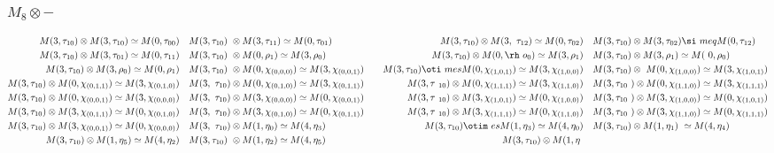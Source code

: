 \subsubsection{$M_8\otimes -$}
\begin{align*}
M(3,\tau_{10}) \otimes M(3,\tau_{10}) \simeq M(0,\tau_{00}) &&& M(3,\tau_{10})\
 \otimes M(3,\tau_{11}) \simeq M(0,\tau_{01}) &&& M(3,\tau_{10}) \otimes M(3,\
\tau_{12}) \simeq M(0,\tau_{02}) &&& M(3,\tau_{10}) \otimes M(3,\tau_{02}) \si\
meq M(0,\tau_{12})\\
M(3,\tau_{10}) \otimes M(3,\tau_{01}) \simeq M(0,\tau_{11}) &&& M(3,\tau_{10})\
 \otimes M(0,\rho_{1}) \simeq M(3,\rho_{0}) &&& M(3,\tau_{10}) \otimes M(0,\rh\
o_{0}) \simeq M(3,\rho_{1}) &&& M(3,\tau_{10}) \otimes M(3,\rho_{1}) \simeq M(\
0,\rho_{0})\\
M(3,\tau_{10}) \otimes M(3,\rho_{0}) \simeq M(0,\rho_{1}) &&& M(3,\tau_{10}) \
\otimes M(0,\chi_{(0,0,0)}) \simeq M(3,\chi_{(0,0,1)}) &&& M(3,\tau_{10}) \oti\
mes M(0,\chi_{(1,0,1)}) \simeq M(3,\chi_{(1,0,0)}) &&& M(3,\tau_{10}) \otimes \
M(0,\chi_{(1,0,0)}) \simeq M(3,\chi_{(1,0,1)})\\
M(3,\tau_{10}) \otimes M(0,\chi_{(0,1,1)}) \simeq M(3,\chi_{(0,1,0)}) &&& M(3,\
\tau_{10}) \otimes M(0,\chi_{(0,1,0)}) \simeq M(3,\chi_{(0,1,1)}) &&& M(3,\tau\
_{10}) \otimes M(0,\chi_{(1,1,1)}) \simeq M(3,\chi_{(1,1,0)}) &&& M(3,\tau_{10\
}) \otimes M(0,\chi_{(1,1,0)}) \simeq M(3,\chi_{(1,1,1)})\\
M(3,\tau_{10}) \otimes M(0,\chi_{(0,0,1)}) \simeq M(3,\chi_{(0,0,0)}) &&& M(3,\
\tau_{10}) \otimes M(3,\chi_{(0,0,0)}) \simeq M(0,\chi_{(0,0,1)}) &&& M(3,\tau\
_{10}) \otimes M(3,\chi_{(1,0,1)}) \simeq M(0,\chi_{(1,0,0)}) &&& M(3,\tau_{10\
}) \otimes M(3,\chi_{(1,0,0)}) \simeq M(0,\chi_{(1,0,1)})\\
M(3,\tau_{10}) \otimes M(3,\chi_{(0,1,1)}) \simeq M(0,\chi_{(0,1,0)}) &&& M(3,\
\tau_{10}) \otimes M(3,\chi_{(0,1,0)}) \simeq M(0,\chi_{(0,1,1)}) &&& M(3,\tau\
_{10}) \otimes M(3,\chi_{(1,1,1)}) \simeq M(0,\chi_{(1,1,0)}) &&& M(3,\tau_{10\
}) \otimes M(3,\chi_{(1,1,0)}) \simeq M(0,\chi_{(1,1,1)})\\
M(3,\tau_{10}) \otimes M(3,\chi_{(0,0,1)}) \simeq M(0,\chi_{(0,0,0)}) &&& M(3,\
\tau_{10}) \otimes M(1,\eta_{0}) \simeq M(4,\eta_{3}) &&& M(3,\tau_{10}) \otim\
es M(1,\eta_{3}) \simeq M(4,\eta_{0}) &&& M(3,\tau_{10}) \otimes M(1,\eta_{1})\
 \simeq M(4,\eta_{4})\\
M(3,\tau_{10}) \otimes M(1,\eta_{5}) \simeq M(4,\eta_{2}) &&& M(3,\tau_{10}) \
\otimes M(1,\eta_{2}) \simeq M(4,\eta_{5}) &&& M(3,\tau_{10}) \otimes M(1,\eta\

\end{align*}
